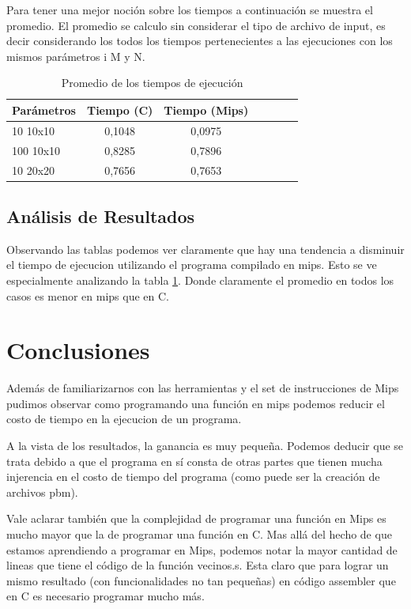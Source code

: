 \documentclass[11pt,a4paper]{article}
\begin{document}
Para tener una mejor noción sobre los tiempos a continuación se muestra el promedio. El promedio se calculo sin considerar el tipo de archivo de input, es decir considerando los todos los tiempos pertenecientes a las ejecuciones con los mismos parámetros i M y N.

\begin{table}[H]
	\centering
	\begin{tabular}{|l|c|c|c|c|c|c|}
	\hline
	\textbf{Parámetros}&\textbf{Tiempo (C)}&\textbf{ Tiempo (Mips)}\\
	\hline
	10 10x10 &	0,1048&	0,0975\\
	\hline
	100 10x10&	0,8285&	0,7896\\
	\hline
	10 20x20 &	0,7656&	0,7653\\		
	\hline
	\end{tabular}
	\caption{Promedio de los tiempos de ejecución}
	\label{tab:prom}
\end{table}

\subsection{Análisis de Resultados}
Observando las tablas podemos ver claramente que hay una tendencia a disminuir el tiempo de ejecucion utilizando el programa compilado en mips. Esto se ve especialmente analizando la tabla \ref{tab:prom}. Donde claramente el promedio en todos los casos es menor en mips que en C.

\section{Conclusiones}
Además de familiarizarnos con las herramientas y el set de instrucciones de Mips pudimos observar como programando una función en mips podemos reducir el costo de tiempo en la ejecucion de un programa.

A la vista de los resultados, la ganancia es muy pequeña. Podemos deducir que se trata debido a que el programa en sí consta de otras partes que tienen mucha injerencia en el costo de tiempo del programa (como puede ser la creación de archivos pbm).

Vale aclarar también que la complejidad de programar una función en Mips es mucho mayor que la de programar una función en C. Mas allá del hecho de que estamos aprendiendo a programar en Mips, podemos notar la mayor cantidad de lineas que tiene el código de la función vecinos.s. Esta claro que para lograr un mismo resultado (con funcionalidades no tan pequeñas) en código assembler que en C es necesario programar mucho más.
\end{document}
